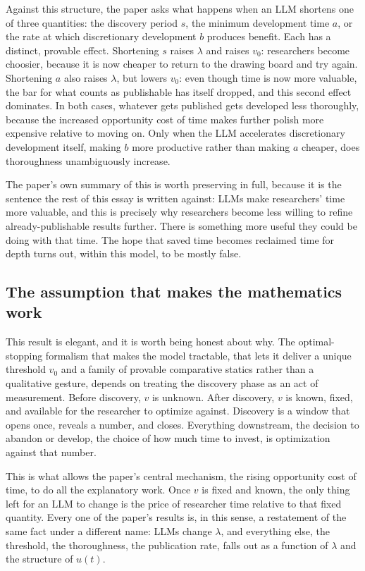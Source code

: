 \documentclass[11pt]{article}
\begin{document}
Against this structure, the paper asks what happens when an LLM shortens one of three quantities: the discovery period $s$, the minimum development time $a$, or the rate at which discretionary development $b$ produces benefit. Each has a distinct, provable effect. Shortening $s$ raises $\lambda$ and raises $v_0$: researchers become choosier, because it is now cheaper to return to the drawing board and try again. Shortening $a$ also raises $\lambda$, but lowers $v_0$: even though time is now more valuable, the bar for what counts as publishable has itself dropped, and this second effect dominates. In both cases, whatever gets published gets developed less thoroughly, because the increased opportunity cost of time makes further polish more expensive relative to moving on. Only when the LLM accelerates discretionary development itself, making $b$ more productive rather than making $a$ cheaper, does thoroughness unambiguously increase.

The paper's own summary of this is worth preserving in full, because it is the sentence the rest of this essay is written against: LLMs make researchers' time more valuable, and this is precisely why researchers become less willing to refine already-publishable results further. There is something more useful they could be doing with that time. The hope that saved time becomes reclaimed time for depth turns out, within this model, to be mostly false.

\subsection{The assumption that makes the mathematics work}

This result is elegant, and it is worth being honest about why. The optimal-stopping formalism that makes the model tractable, that lets it deliver a unique threshold $v_0$ and a family of provable comparative statics rather than a qualitative gesture, depends on treating the discovery phase as an act of measurement. Before discovery, $v$ is unknown. After discovery, $v$ is known, fixed, and available for the researcher to optimize against. Discovery is a window that opens once, reveals a number, and closes. Everything downstream, the decision to abandon or develop, the choice of how much time to invest, is optimization against that number.

This is what allows the paper's central mechanism, the rising opportunity cost of time, to do all the explanatory work. Once $v$ is fixed and known, the only thing left for an LLM to change is the price of researcher time relative to that fixed quantity. Every one of the paper's results is, in this sense, a restatement of the same fact under a different name: LLMs change $\lambda$, and everything else, the threshold, the thoroughness, the publication rate, falls out as a function of $\lambda$ and the structure of $u(t)$.
\end{document}
